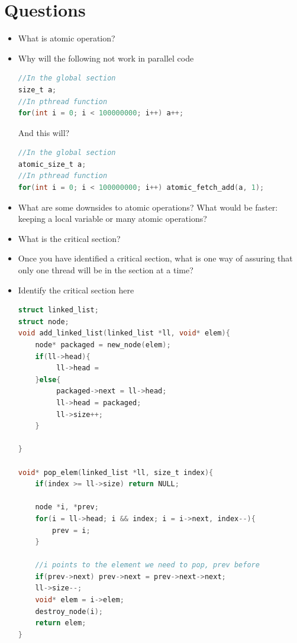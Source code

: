 \section{Questions}\label{questions}

\begin{itemize}
\tightlist
\item
  What is atomic operation?
\item
  Why will the following not work in parallel code

\begin{lstlisting}[language=C]
//In the global section
size_t a;
//In pthread function
for(int i = 0; i < 100000000; i++) a++;
\end{lstlisting}

  And this will?

\begin{lstlisting}[language=C]
//In the global section
atomic_size_t a;
//In pthread function
for(int i = 0; i < 100000000; i++) atomic_fetch_add(a, 1);
\end{lstlisting}
\item
  What are some downsides to atomic operations? What would be faster: keeping a local variable or many atomic operations?
\item
  What is the critical section?
\item
  Once you have identified a critical section, what is one way of assuring that only one thread will be in the section at a time?
\item
  Identify the critical section here

\begin{lstlisting}[language=C]
struct linked_list;
struct node;
void add_linked_list(linked_list *ll, void* elem){
    node* packaged = new_node(elem);
    if(ll->head){
         ll->head = 
    }else{
         packaged->next = ll->head;
         ll->head = packaged;
         ll->size++;
    }
    
}

void* pop_elem(linked_list *ll, size_t index){
    if(index >= ll->size) return NULL;
    
    node *i, *prev;
    for(i = ll->head; i && index; i = i->next, index--){
        prev = i;
    }

    //i points to the element we need to pop, prev before
    if(prev->next) prev->next = prev->next->next;
    ll->size--;
    void* elem = i->elem;
    destroy_node(i);
    return elem;
}
\end{lstlisting}


\end{itemize}
